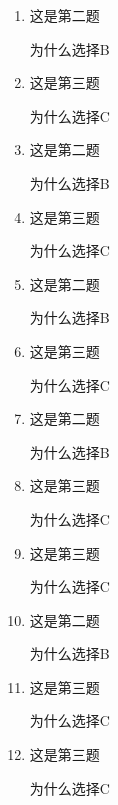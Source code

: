\documentclass{sxtzh}
\begin{document}
\begin{enumerate}[resume]
    \item 这是第二题
    \begin{solution}
        为什么选择B
    \end{solution}
    \item 这是第三题
    \begin{solution}
        为什么选择C
    \end{solution}
    \item 这是第二题
    \begin{solution}
        为什么选择B
    \end{solution}
    \item 这是第三题
    \begin{solution}
        为什么选择C
    \end{solution}
    \item 这是第二题
    \begin{solution}
        为什么选择B
    \end{solution}
    \item 这是第三题
    \begin{solution}
        为什么选择C
    \end{solution}
    \item 这是第二题
    \begin{solution}
        为什么选择B
    \end{solution}
    \item 这是第三题
    \begin{solution}
        为什么选择C
    \end{solution}
    \item 这是第三题
    \begin{solution}
        为什么选择C
    \end{solution}
    \item 这是第二题
    \begin{solution}
        为什么选择B
    \end{solution}
    \item 这是第三题
    \begin{solution}
        为什么选择C
    \end{solution}
    \item 这是第三题
    \begin{solution}
        为什么选择C
    \end{solution}

\end{enumerate}
\end{document}
